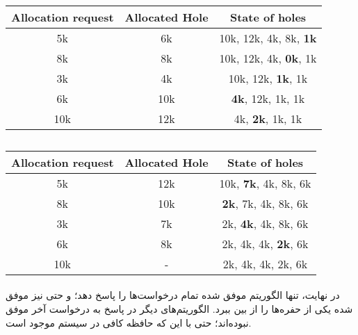 \documentclass{article}
\begin{document}
	\subsection*{}
	\paragraph*{}

	\begin{latin}
		\centering
		\begin{tabular}{c|c|c}
			Allocation request & Allocated Hole & State of holes \\
			\hline
			5k & 6k & 10k, 12k, 4k, 8k, \textbf{1k}\\
			\hline
			8k & 8k & 10k, 12k, 4k, \textbf{0k}, 1k \\
			\hline
			3k & 4k &  10k, 12k, \textbf{1k}, 1k \\
			\hline
			6k & 10k & \textbf{4k}, 12k, 1k, 1k\\
			\hline
			10k & 12k & 4k, \textbf{2k}, 1k, 1k\\
		\end{tabular}
	\end{latin}

	\subsection*{}
	\paragraph*{}

	\begin{latin}
		\centering
		\begin{tabular}{c|c|c}
			Allocation request & Allocated Hole & State of holes \\
			\hline
			5k & 12k & 10k, \textbf{7k}, 4k, 8k, 6k\\
			\hline
			8k & 10k & \textbf{2k}, 7k, 4k, 8k, 6k\\
			\hline
			3k & 7k &  2k, \textbf{4k}, 4k, 8k, 6k\\
			\hline
			6k & 8k & 2k, 4k, 4k, \textbf{2k}, 6k\\
			\hline
			10k & - & 2k, 4k, 4k, 2k, 6k\\
		\end{tabular}
	\end{latin}

	\paragraph*{}
	در نهایت، تنها الگوریتم
	موفق شده تمام درخواست‌ها را پاسخ دهد؛ و حتی نیز موفق شده یکی از حفره‌ها را از بین ببرد. الگوریتم‌های دیگر در پاسخ به درخواست آخر موفق نبوده‌اند؛ حتی با این که حافظه کافی در سیستم موجود است.
\end{document}
